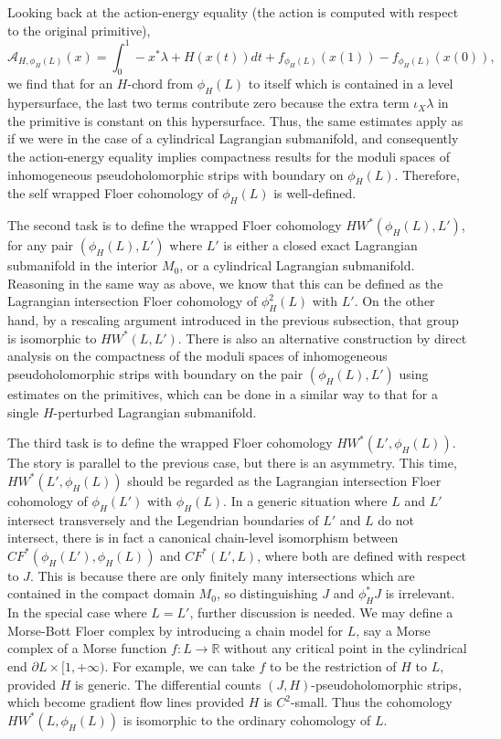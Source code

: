 \documentclass{amsart}
\numberwithin{equation}{section}
\numberwithin{figure}{section}
\begin{document}
	Looking back at the action-energy equality (the action is computed with respect to the original primitive),
\begin{equation*}
\mathcal{A}_{H, \phi_{H}(L)}(x) = \int_{0}^{1} -x^{*}\lambda + H(x(t))dt + f_{\phi_{H}(L)}(x(1)) - f_{\phi_{H}(L)}(x(0)),
\end{equation*}
we find that for an $H$-chord from $\phi_{H}(L)$ to itself which is contained in a level hypersurface, the last two terms contribute zero because the extra term $\iota_{X}\lambda$ in the primitive is constant on this hypersurface. Thus, the same estimates apply as if we were in the case of a cylindrical Lagrangian submanifold, and consequently the action-energy equality implies compactness results for the moduli spaces of inhomogeneous pseudoholomorphic strips with boundary on $\phi_{H}(L)$. Therefore, the self wrapped Floer cohomology of $\phi_{H}(L)$ is well-defined. \par
	The second task is to define the wrapped Floer cohomology $HW^{*}(\phi_{H}(L), L')$, for any pair $(\phi_{H}(L), L')$ where $L'$ is either a closed exact Lagrangian submanifold in the interior $M_{0}$, or a cylindrical Lagrangian submanifold. Reasoning in the same way as above, we know that this can be defined as the Lagrangian intersection Floer cohomology of $\phi_{H}^{2}(L)$ with $L'$. On the other hand, by a rescaling argument introduced in the previous subsection, that group is isomorphic to $HW^{*}(L, L')$. There is also an alternative construction by direct analysis on the compactness of the moduli spaces of inhomogeneous pseudoholomorphic strips with boundary on the pair $(\phi_{H}(L), L')$ using estimates on the primitives, which can be done in a similar way to that for a single $H$-perturbed Lagrangian submanifold. \par
	The third task is to define the wrapped Floer cohomology $HW^{*}(L', \phi_{H}(L))$. The story is parallel to the previous case, but there is an asymmetry. This time, $HW^{*}(L', \phi_{H}(L))$ should be regarded as the Lagrangian intersection Floer cohomology of $\phi_{H}(L')$ with $\phi_{H}(L)$. In a generic situation where $L$ and $L'$ intersect transversely and the Legendrian boundaries of $L'$ and $L$ do not intersect, there is in fact a canonical chain-level isomorphism between $CF^{*}(\phi_{H}(L'), \phi_{H}(L))$ and $CF^{*}(L', L)$, where both are defined with respect to $J$. This is because there are only finitely many intersections which are contained in the compact domain $M_{0}$, so distinguishing $J$ and $\phi_{H}^{*}J$ is irrelevant. In the special case where $L = L'$, further discussion is needed. We may define a Morse-Bott Floer complex by introducing a chain model for $L$, say a Morse complex of a Morse function $f: L \to \mathbb{R}$ without any critical point in the cylindrical end $\partial L \times [1, +\infty)$. For example, we can take $f$ to be the restriction of $H$ to $L$, provided $H$ is generic. The differential counts $(J, H)$-pseudoholomorphic strips, which become gradient flow lines provided $H$ is $C^{2}$-small. Thus the cohomology $HW^{*}(L, \phi_{H}(L))$ is isomorphic to the ordinary cohomology of $L$. \par
\end{document}
